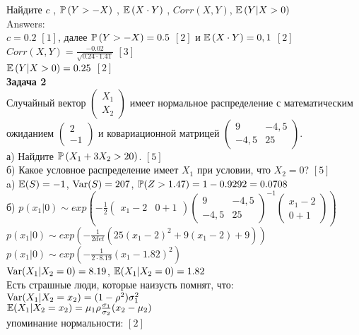 \documentclass[pdftex,12pt,a4paper]{article}
\begin{document}
Найдите  $c$ ,  $\P\left(Y>-X\right)$ ,  $\E\left(X\cdot Y
\right)$ , $Corr(X,Y)$, $\E\left(Y|X>0\right)$ \\
Answers: \\
$c=0.2$ $[1]$, далее $\P\left(Y>-X\right)=0.5$ $[2]$ и $\E\left(X\cdot Y\right)=0,1$ $[2]$ \\
$Corr(X,Y)=\frac{-0.02}{\sqrt{0.24\cdot 1.41}}$ $[3]$ \\
$\E\left(Y|X>0\right)=0.25$ $[2]$ \\

\textbf{Задача 2} \\ %
Случайный вектор  $\left(\begin{array}{c}
{X_{1} } \\ {X_{2} }
\end{array}\right)$  имеет нормальное распределение с
математическим ожиданием  $\left(\begin{array}{c} {2} \\ {-1}
\end{array}\right)$  и ковариационной матрицей
$\left(\begin{array}{cc} {9} & {-4,5} \\ {-4,5} & {25}
\end{array}\right)$. \\
а) Найдите  $\P\left(X_{1} +3X_{2} >20\right)$. $[5]$ \\
б) Какое условное распределение имеет $X_{1}$ при условии, что $X_{2}=0$? $[5]$ \\
a) $\E(S)=-1$, $\Var(S)=207$, $\P(Z>1.47)=1-0.9292=0.0708$ \\
б) $p(x_{1}|0)\sim exp\left(-\frac{1}{2}\left(\begin{array}{cc} {x_{1}-2} & {0+1} \end{array}\right) \left(\begin{array}{cc} {9} & {-4,5} \\ {-4,5} & {25}
\end{array}\right)^{-1}\left(\begin{array}{c} {x_{1}-2} \\ {0+1}
\end{array}\right)\right)$ \\
$p(x_{1}|0)\sim exp\left(-\frac{1}{2det}(25(x_{1}-2)^{2}+9(x_{1}-2)+9)\right)$ \\
$p(x_{1}|0)\sim exp\left(-\frac{1}{2\cdot 8.19}(x_{1}-1.82)^{2}\right)$ \\
$\Var(X_{1}|X_{2}=0)=8.19$, $\E(X_{1}|X_{2}=0)=1.82$ \\
Есть страшные люди, которые наизусть помнят, что: \\
$\Var(X_{1}|X_{2}=x_{2})=(1-\rho^{2})\sigma_{1}^{2}$ \\
$\E(X_{1}|X_{2}=x_{2})=\mu_{1}\rho\frac{\sigma_{1}}{\sigma_{2}}(x_{2}-\mu_{2})$ \\
упоминание нормальности: $[2]$ \\
\end{document}
